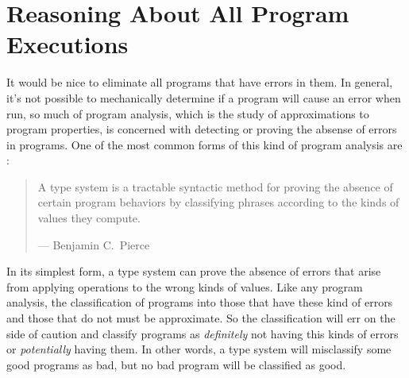 \newcommand\typevaljudge[3]{{#1}\vdash{#2}:{#3}}
\newcommand\mtype{t}
\newcommand\typeof{\mathit{typeof}}
\newcommand\treduce{\mathbf{t}}
\newcommand\mtans{ta}
\newcommand\Ans{\mathit{Ans}}
\newcommand\TyAns{\mathit{TyAns}}

\newcommand\meint{i^\dagger}
\newcommand\moeint{j^\dagger}
\newcommand\mintv{\vec\mint}
\newcommand\mointv{\vec\moint}

\newcommand\BI{\mathcal{BI}}
\newcommand\ireduce{\mathbf{i}}
\newcommand\sreduce{\mathbf{s}}
\newcommand\intvdiv{\mathop\backslash}

\newcommand\mpath{\phi}
\newcommand\mcon{c}
\newcommand\msval{sv}
\newcommand\mcset{\mathcal{T}}
\newcommand\mtcons{tc}

\newcommand\allows[2][\mpath]{#1\models #2}

\section{Reasoning About All Program Executions} %

It would be nice to eliminate all programs that have errors in them.
In general, it's not possible to mechanically determine if a program
will cause an error when run, so much of program analysis, which is
the study of approximations to program properties, is concerned with
detecting or proving the absense of errors in programs.  One of the
most common forms of this kind of program analysis are :

\begin{quotation}
A type system is a tractable syntactic method for proving the absence
of certain program behaviors by classifying phrases according to the
kinds of values they compute.

\raggedleft --- Benjamin C.~Pierce
\end{quotation}

In its simplest form, a type system can prove the absence of errors
that arise from applying operations to the wrong kinds of values.  Like
any program analysis, the classification of programs into those that
have these kind of errors and those that do not must be approximate.
So the classification will err on the side of caution and classify
programs as \emph{definitely} not having this kinds of errors or
\emph{potentially} having them.  In other words, a type system will
misclassify some good programs as bad, but no bad program will be
classified as good.

